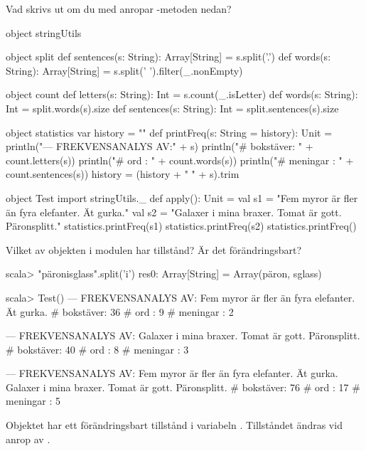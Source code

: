 \Subtask Vad skrivs ut om du med  anropar -metoden nedan?
\begin{Code}
object stringUtils {
  object split {
    def sentences(s: String): Array[String] = s.split('.')
    def words(s: String):     Array[String] = s.split(' ').filter(_.nonEmpty)
  }

  object count {
    def letters(s: String):   Int = s.count(_.isLetter)
    def words(s: String):     Int = split.words(s).size
    def sentences(s: String): Int = split.sentences(s).size
  }

  object statistics {
    var history = ""
    def printFreq(s: String = history): Unit = {
      println("\n--- FREKVENSANALYS AV:\n" + s)
      println("# bokstäver: " + count.letters(s))
      println("# ord      : " + count.words(s))
      println("# meningar : " + count.sentences(s))
      history = (history + " " + s).trim
    }
  }
}

object Test {
  import stringUtils._
  def apply(): Unit = {
    val s1 = "Fem     myror är fler än fyra elefanter. Ät gurka."
    val s2 = "Galaxer i mina braxer. Tomat är gott. Päronsplitt."
    statistics.printFreq(s1)
    statistics.printFreq(s2)
    statistics.printFreq()
  }
}
\end{Code}

\Subtask Vilket av objekten i modulen  har tillstånd? Är det förändringsbart?


\SOLUTION


\TaskSolved \what

\SubtaskSolved
\begin{REPLnonum}
scala> "päronisglass".split('i')
res0: Array[String] = Array(päron, sglass)
\end{REPLnonum}

\SubtaskSolved
\begin{REPLnonum}
scala> Test()
--- FREKVENSANALYS AV:
Fem     myror är fler än fyra elefanter. Ät gurka.
# bokstäver: 36
# ord      : 9
# meningar : 2

--- FREKVENSANALYS AV:
Galaxer i mina braxer. Tomat är gott. Päronsplitt.
# bokstäver: 40
# ord      : 8
# meningar : 3

--- FREKVENSANALYS AV:
Fem     myror är fler än fyra elefanter. Ät gurka. Galaxer i mina braxer. Tomat
är gott. Päronsplitt.
# bokstäver: 76
# ord      : 17
# meningar : 5
\end{REPLnonum}

\SubtaskSolved  Objektet  har ett förändringsbart tillstånd i variabeln . Tillståndet ändras vid anrop av .

